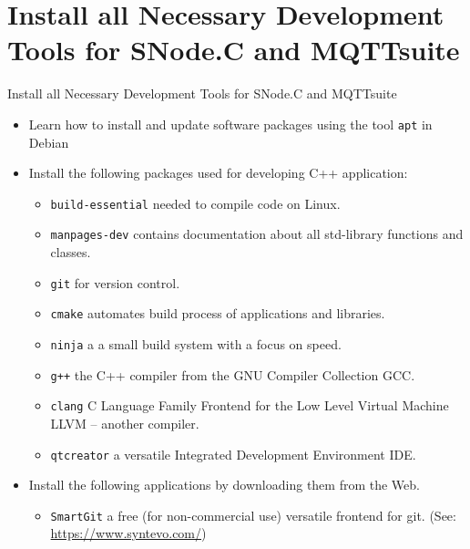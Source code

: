 \nosectionpage
\section{Install all Necessary Development Tools for SNode.C and MQTTsuite}
\withsectionpage

\begin{frame}{Install all Necessary Development Tools for SNode.C and MQTTsuite}
  \begin{itemize}
    \item Learn how to install and update software packages using the tool \alert{\texttt{apt}} in Debian
    \item Install the following packages used for developing C++ application:
    \begin{itemize}
      \item \alert{\texttt{build-essential}} needed to compile code on Linux.
      \item \alert{\texttt{manpages-dev}} contains documentation about all std-library functions and classes.
      \item \alert{\texttt{git}} for version control.
      \item \alert{\texttt{cmake}} automates build process of applications and libraries.
      \item \alert{\texttt{ninja}} a a small build system with a focus on speed.
      \item \alert{\texttt{g++}} the C++ compiler from the \alert{G}NU \alert{C}ompiler \alert{C}ollection \alert{GCC}.
      \item \alert{\texttt{clang}} \alert{C} \alert{L}anguage \alert{F}amily \alert{F}rontend for the \alert{L}ow \alert{L}evel \alert{V}irtual \alert{M}achine \alert{LLVM} -- another compiler.
      \item \alert{\texttt{qtcreator}} a versatile \alert{I}ntegrated \alert{D}evelopment \alert{E}nvironment \alert{IDE}.
    \end{itemize}
    \item Install the following applications by downloading them from the Web.
    \begin{itemize}
      \item \alert{\texttt{SmartGit}} a free (for non-commercial use) versatile frontend for git. (See: \alert{\href{https://www.syntevo.com/}{https://www.syntevo.com/}})
    \end{itemize}
  \end{itemize}
\end{frame}
